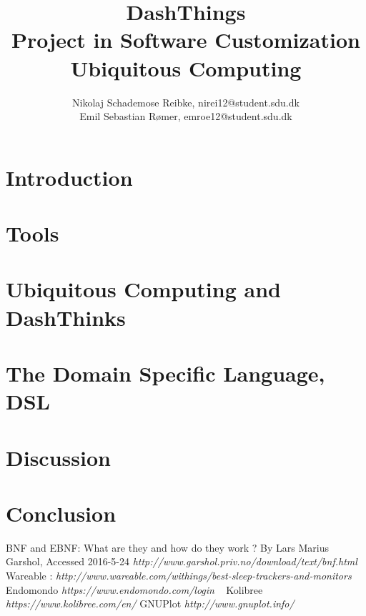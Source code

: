 \documentclass[12pt,a4paper]{article}
\begin{document}
\linespread{1.25}
\title{\textbf{DashThings \\ Project in Software Customization Ubiquitous Computing}}

\author{Nikolaj Schademose Reibke, nirei12@student.sdu.dk\\Emil Sebastian R{\o}mer, emroe12@student.sdu.dk}

\maketitle

\section{Introduction}


\section{Tools}


\section{Ubiquitous Computing and DashThinks}


\section{The Domain Specific Language, DSL}


\section{Discussion}


\section{Conclusion}



\begin{thebibliography}{1}
 BNF and EBNF: What are they and how do they work ? By Lars Marius Garshol, Accessed 2016-5-24 \textit{http://www.garshol.priv.no/download/text/bnf.html}
 Wareable : \textit{http://www.wareable.com/withings/best-sleep-trackers-and-monitors} 
 Endomondo \textit{https://www.endomondo.com/login}
\
 Kolibree \textit{https://www.kolibree.com/en/}
\bibitem{GNUPlot} GNUPlot \textit{http://www.gnuplot.info/}
\end{thebibliography}
\end{document}
